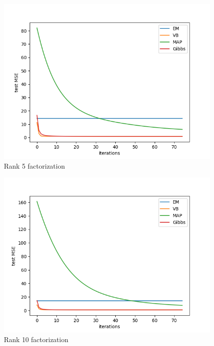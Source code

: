 \documentclass[journal,onecolumn]{IEEEtran}
\begin{document}
\begin{figure}[H]
	\centering
	\includegraphics[width=150mm]{rank_5.png}
	\caption{Rank 5 factorization}
\end{figure}

\begin{figure}[H]
	\centering
	\includegraphics[width=150mm]{rank_10.png}
	\caption{Rank 10 factorization}
\end{figure}
\end{document}

